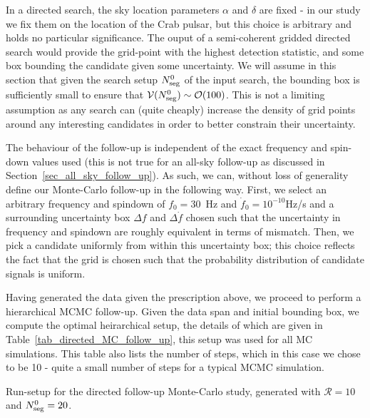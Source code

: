 \documentclass[aps, prd, twocolumn, superscriptaddress, floatfix, showpacs, nofootinbib, longbibliography]{revtex4-1}
\begin{document}
In a directed search, the sky location parameters $\alpha$ and $\delta$ are
fixed - in our study we fix them on the location of the Crab pulsar, but this
choice is arbitrary and holds no particular significance. The ouput of a
semi-coherent gridded directed search would provide the grid-point with the
highest detection statistic, and some box bounding the candidate given some
uncertainty. We will assume in this section that given the search setup
$N_{\rm seg}^{0}$ of the input search, the bounding box is sufficiently small to
ensure that $\mathcal{V}(N_{\rm seg}^0)\sim \mathcal{O}(100)$. This is not a limiting
assumption as any search can (quite cheaply) increase the density of grid
points around any interesting candidates in order to better constrain their
uncertainty.

The behaviour of the follow-up is independent of the exact frequency and
spin-down values used (this is not true for an all-sky follow-up as discussed
in Section~\ref{sec_all_sky_follow_up}). As such, we can, without loss of
generality define our Monte-Carlo follow-up in the following way. First, we
select an arbitrary frequency and spindown of $f_0=30$~Hz and
$\dot{f}_0=10^{-10}$Hz/s and a surrounding uncertainty box $\Delta f$ and
$\Delta \dot{f}$ chosen such that the uncertainty in frequency and spindown are
roughly equivalent in terms of mismatch. Then, we pick a candidate uniformly
from within this uncertainty box; this choice reflects the fact that the grid
is chosen such that the probability distribution of candidate signals is
uniform.



Having generated the data given the prescription above, we proceed to perform a
hierarchical MCMC follow-up. Given the data span and initial bounding box, we
compute the optimal heirarchical setup, the details of which are given in
Table~\ref{tab_directed_MC_follow_up}, this setup was used for all MC
simulations. This table also lists the number of steps, which in this case we
chose to be 10 - quite a small number of steps for a typical MCMC simulation.

\begin{table}[htb]
\caption{Run-setup for the directed follow-up Monte-Carlo study, generated with
$\mathcal{R}=10$ and $N_{\rm seg}^0=20$.}
\label{tab_directed_MC_follow_up}

\end{table}
\end{document}
